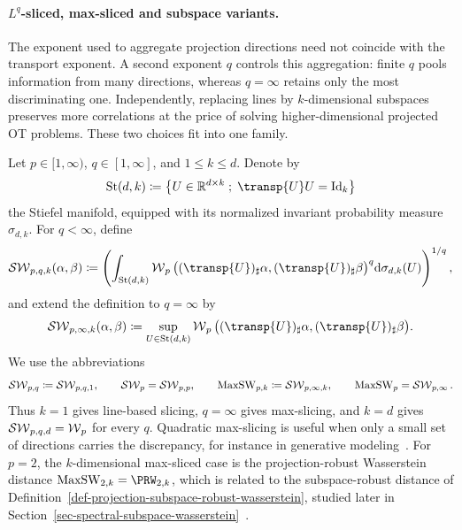 \paragraph{$L^q$-sliced, max-sliced and subspace variants.}

The exponent used to aggregate projection directions need not coincide with the
transport exponent. A second exponent $q$ controls this aggregation: finite
$q$ pools information from many directions, whereas $q=\infty$ retains only
the most discriminating one. Independently, replacing lines by
$k$-dimensional subspaces preserves more correlations at the price of solving
higher-dimensional projected OT problems. These two choices fit into one
family.

\begin{defn}\label{def-sliced-variants}
	Let $p\in[1,\infty)$, $q\in[1,\infty]$, and $1\leq k\leq d$. Denote by
	\[
		\mathrm{St}(d,k)
		\eqdef
		\enscond{U\in\RR^{d\times k}}{\transp{U}U=\Id_k}
	\]
	the Stiefel manifold, equipped with its normalized invariant probability
	measure $\sigma_{d,k}$. For $q<\infty$, define
	\begin{equation}\label{eq-lq-subspace-sliced}
		\SW_{p,q,k}(\alpha,\beta)
		\eqdef
		\left(
			\int_{\mathrm{St}(d,k)}
			\Wass_p\big((\transp{U})_\sharp\alpha,
			              (\transp{U})_\sharp\beta\big)^q
			\d\sigma_{d,k}(U)
		\right)^{1/q},
	\end{equation}
	and extend the definition to $q=\infty$ by
	\[
		\SW_{p,\infty,k}(\alpha,\beta)
		\eqdef
		\sup_{U\in\mathrm{St}(d,k)}
		\Wass_p\big((\transp{U})_\sharp\alpha,
		              (\transp{U})_\sharp\beta\big).
	\]
	We use the abbreviations
	\[
		\operatorname{\mathcal{SW}}_{p,q}\coloneqq\operatorname{\mathcal{SW}}_{p,q,1},
		\qquad
		\operatorname{\mathcal{SW}}_p=\operatorname{\mathcal{SW}}_{p,p},
		\qquad
		\operatorname{MaxSW}_{p,k}\coloneqq\operatorname{\mathcal{SW}}_{p,\infty,k},
		\qquad
		\operatorname{MaxSW}_p=\operatorname{\mathcal{SW}}_{p,\infty}.
	\]
	Thus $k=1$ gives line-based slicing, $q=\infty$ gives max-slicing,
	and $k=d$ gives $\operatorname{\mathcal{SW}}_{p,q,d}=\operatorname{\mathcal{W}}_p$ for every $q$. Quadratic max-slicing is useful
	when only a small set of directions carries the discrepancy, for instance in
	generative modeling~\cite{deshpande2019maxsliced}. For $p=2$, the $k$-dimensional
	max-sliced case is the projection-robust Wasserstein distance
	$\MaxSW_{2,k}=\PRW_{2,k}$, which is related to the
	subspace-robust distance of
	Definition~\ref{def-projection-subspace-robust-wasserstein}, studied later in
	Section~\ref{sec-spectral-subspace-wasserstein}~\cite{paty2019subspace}.
\end{defn}


